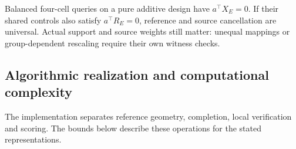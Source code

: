 \documentclass[preprint,12pt,number,sort&compress]{elsarticle}
\begin{document}
Balanced four-cell queries on a pure additive design have $a^\top X_E=0$. If their shared controls also satisfy $a^\top R_E=0$, reference and source cancellation are universal. Actual support and source weights still matter: unequal mappings or group-dependent rescaling require their own witness checks.





\subsection{Algorithmic realization and computational complexity}\label{subsec:complexity}
The implementation separates reference geometry, completion, local verification and scoring. The bounds below describe these operations for the stated representations.
\end{document}
